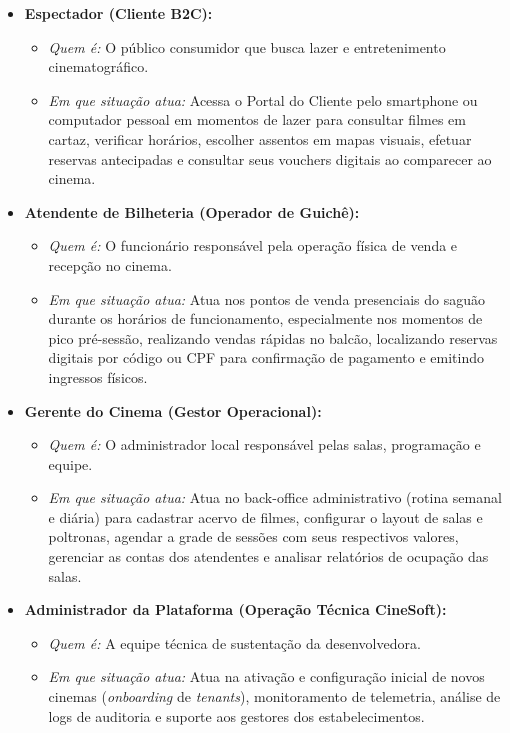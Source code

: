 \begin{itemize}
\tightlist
\item \textbf{Espectador (Cliente B2C):}
  \begin{itemize}
  \tightlist
  \item \emph{Quem é:} O público consumidor que busca lazer e entretenimento cinematográfico.
  \item \emph{Em que situação atua:} Acessa o Portal do Cliente pelo smartphone ou computador pessoal em momentos de lazer para consultar filmes em cartaz, verificar horários, escolher assentos em mapas visuais, efetuar reservas antecipadas e consultar seus vouchers digitais ao comparecer ao cinema.
  \end{itemize}
\item \textbf{Atendente de Bilheteria (Operador de Guichê):}
  \begin{itemize}
  \tightlist
  \item \emph{Quem é:} O funcionário responsável pela operação física de venda e recepção no cinema.
  \item \emph{Em que situação atua:} Atua nos pontos de venda presenciais do saguão durante os horários de funcionamento, especialmente nos momentos de pico pré-sessão, realizando vendas rápidas no balcão, localizando reservas digitais por código ou CPF para confirmação de pagamento e emitindo ingressos físicos.
  \end{itemize}
\item \textbf{Gerente do Cinema (Gestor Operacional):}
  \begin{itemize}
  \tightlist
  \item \emph{Quem é:} O administrador local responsável pelas salas, programação e equipe.
  \item \emph{Em que situação atua:} Atua no back-office administrativo (rotina semanal e diária) para cadastrar acervo de filmes, configurar o layout de salas e poltronas, agendar a grade de sessões com seus respectivos valores, gerenciar as contas dos atendentes e analisar relatórios de ocupação das salas.
  \end{itemize}
\item \textbf{Administrador da Plataforma (Operação Técnica CineSoft):}
  \begin{itemize}
  \tightlist
  \item \emph{Quem é:} A equipe técnica de sustentação da desenvolvedora.
  \item \emph{Em que situação atua:} Atua na ativação e configuração inicial de novos cinemas (\emph{onboarding} de \emph{tenants}), monitoramento de telemetria, análise de logs de auditoria e suporte aos gestores dos estabelecimentos.
  \end{itemize}
\end{itemize}


